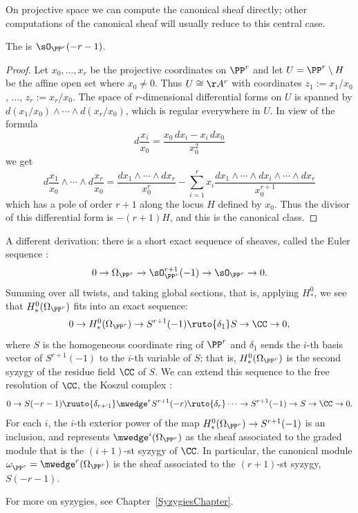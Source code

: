 On projective space we can compute the canonical sheaf directly; other computations of the canonical sheaf will usually reduce to this central case.

\begin{theorem}
 The 
%
is $\sO_{\PP^{r}}(-r-1)$. 
\vspace*{-\parskip}
\end{theorem}

\begin{proof}
Let $x_{0}, \dots, x_{r}$ be the projective coordinates on $\PP^{r}$
and let  $U = \PP^{r}\setminus H$ be the affine open set where $x_{0}
\neq 0$. Thus $U \cong \AA^{r}$ with coordinates $z_{1} :=
x_{1}/x_{0}$, $\dots$, $z_{r}:=x_{r}/x_{0}$. The space of
$r$-dimensional differential forms on $U$ is spanned by
$d(x_{1}/x_{0})\wedge\cdots\wedge d(x_{r}/x_{0})$, which is regular
everywhere in $U$. In view of the formula
$$
d\frac{x_{i}}{x_{0}} = \frac{x_{0}\,dx_{i}-x_{i}\,dx_{0}}{x_{0}^{2}}
$$
we get
$$
d\frac{x_1}{x_0}\wedge\cdots\wedge 
d\frac{x_r}{x_0}
= \frac{dx_{1}\wedge\cdots\wedge dx_{r}}{x_{0}^{r}}-
\sum_{i=1}^{r} x_{i} \frac{ dx_{1}\wedge\cdots \wedge \widehat{dx_{i}}\wedge \cdots \wedge dx_{r}}{x_{0}^{r+1}}
$$
which has a pole of order $r+1$ along the locus $H$ defined by $x_{0}$. Thus the divisor of this differential form
is $-(r+1)H$, and this is the canonical class.
\end{proof}

\begin{fact}
A different derivation: there is a short exact sequence of sheaves,
%
called the Euler sequence \cite[II.8]{Hartshorne1977}:
$$
0\to \Omega_{\PP^{r}} \to \sO_{\PP^{r}}^{r+1} (-1) \to \sO_{\PP^{r}} \to 0.
$$
Summing over all twists, and taking global sections, that is, applying $H^0_*$, we see that 
$H^0_*(\Omega_{\PP^{r}})$ fits into an exact sequence:
$$
0 \to H^0_*(\Omega_{\PP^{r}}) \to S^{r+1}(-1) \ruto{\delta_{1}} S \to \CC \to 0,
$$
where $S$ is the homogeneous coordinate ring of $\PP^r$ and $\delta_1$ sends the $i$-th basis vector of
$S^{r+1}(-1)$ to the $i$-th variable of $S$; that is, $H^0_*(\Omega_{\PP^{r}})$ is the second syzygy of the residue field $\CC$ of $S$. We can extend this sequence to  the free resolution
of $\CC$, 
the Koszul complex
%
\cite[\S17.5]{Eisenbud1995}:
$$
0 \to S(-r-1) \ruuto{\delta_{r+`1}} 
\mwedge^rS^{r+1}(-r) \ruto{\delta_{r}} \cdots \to S^{r+1}(-1) \to S \to \CC \to 0.
$$
For each $i$, the $i$-th exterior power of the map $H^0_*(\Omega_{\PP^{r}}) \to S^{r+1}(-1)$ is an inclusion, and
represents $\mwedge^i(\Omega_{\PP^{r}})$ as the sheaf associated to the graded module that is the $(i+1)$-st syzygy of $\CC$.
In particular, the canonical module $\omega^{}_{\PP^r} = \mwedge^r(\Omega_{\PP^{r}})$ is the sheaf associated to the 
$(r+1)$-st syzygy, $S(-r-1)$.

For more on syzygies, see Chapter~\ref{SyzygiesChapter}.
\end{fact}

